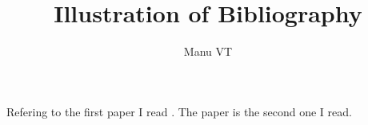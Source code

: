 \documentclass[12pt]{article}
\title{Illustration of Bibliography}
\author{Manu VT}
\begin{document}
\maketitle

Refering to the first paper I read \cite{muja_flann_2009}.
The paper \cite{Lowe:2004:DIF:993451.996342} is the second one I read.


%


\end{document}
